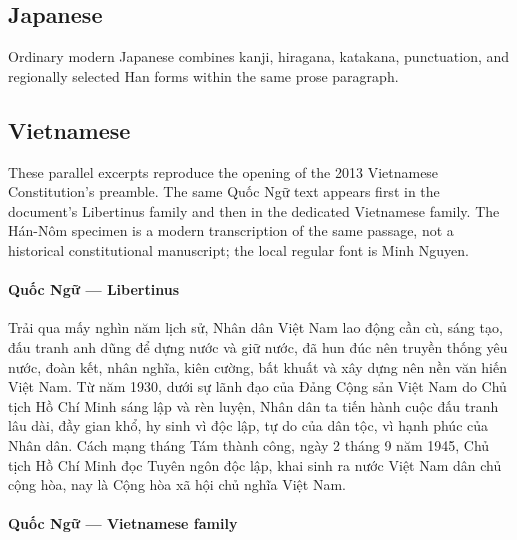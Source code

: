 \documentclass[11pt,twoside]{impeart}
\begin{document}
\subsection{Japanese}

Ordinary modern Japanese combines kanji, hiragana, katakana, punctuation,
and regionally selected Han forms within the same prose paragraph.


\subsection{Vietnamese}

These parallel excerpts reproduce the opening of the 2013 Vietnamese
Constitution's preamble. The same Quốc Ngữ text appears first in the
document's Libertinus family and then in the dedicated Vietnamese
family. The Hán-Nôm specimen is a modern transcription of the same
passage, not a historical constitutional manuscript; the local
regular font is Minh Nguyen.

\paragraph{Quốc Ngữ --- Libertinus}
Trải qua mấy nghìn năm lịch sử, Nhân dân Việt Nam lao động cần cù, sáng tạo, đấu tranh anh dũng để dựng nước và giữ nước, đã hun đúc nên truyền thống yêu nước, đoàn kết, nhân nghĩa, kiên cường, bất khuất và xây dựng nên nền văn hiến Việt Nam. Từ năm 1930, dưới sự lãnh đạo của Đảng Cộng sản Việt Nam do Chủ tịch Hồ Chí Minh sáng lập và rèn luyện, Nhân dân ta tiến hành cuộc đấu tranh lâu dài, đầy gian khổ, hy sinh vì độc lập, tự do của dân tộc, vì hạnh phúc của Nhân dân. Cách mạng tháng Tám thành công, ngày 2 tháng 9 năm 1945, Chủ tịch Hồ Chí Minh đọc Tuyên ngôn độc lập, khai sinh ra nước Việt Nam dân chủ cộng hòa, nay là Cộng hòa xã hội chủ nghĩa Việt Nam.

\paragraph{Quốc Ngữ --- Vietnamese family}
\end{document}
